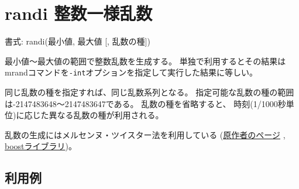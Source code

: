 
%

\section{randi 整数一様乱数\label{sect:randi}}

書式: randi(最小値, 最大値 [, 乱数の種])

最小値〜最大値の範囲で整数乱数を生成する。
単独で利用するとその結果はmrandコマンドを\verb|-int|オプションを指定して実行した結果に等しい。

同じ乱数の種を指定すれば、同じ乱数系列となる。
指定可能な乱数の種の範囲は-2147483648〜2147483647である。
乱数の種を省略すると、
時刻(1/1000秒単位)に応じた異なる乱数の種が利用される。

乱数の生成にはメルセンヌ・ツイスター法を利用している
(\href{http://www.math.sci.hiroshima-u.ac.jp/~m-mat/MT/emt.html}{原作者のページ}
, \href{http://www.boost.org/doc/libs/1_54_0/doc/html/boost_random.html}{boostライブラリ})。

\subsection*{利用例}


%

